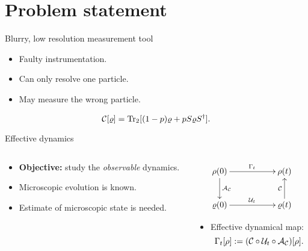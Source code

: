 \section{Problem statement}

\begin{frame}{Blurry, low resolution measurement tool}
    \begin{itemize}
        \item Faulty instrumentation.
        \item Can only resolve one particle.
        \item May measure the wrong particle.
    \end{itemize}
    \begin{equation*}
        \mathcal{C}[\varrho]=\Tr_{2}[(1-p)\varrho+pS\varrho S^{\dag}].
    \end{equation*}
\end{frame}

\begin{frame}{Effective dynamics}
    \begin{columns}
        \begin{column}{0.5\textwidth}
            \begin{itemize}
                \item \textbf{Objective:} study the \textit{observable} dynamics.
                \item Microscopic evolution is known.
                \item Estimate of microscopic state is needed. 
            \end{itemize}
        \end{column}
        \begin{column}{0.5\textwidth}
            \begin{displaymath}
                \xymatrix{
                  {\rho(0)} \ar[rr]^{\Gamma_{t}} \ar[d]^{\mcA_{\mcC}}
                  && {\rho(t)}\\
                  {\varrho(0)} \ar[rr]^{\mcU_{t}}
                  && {\varrho(t)} \ar[u]^{\mcC}
                }
              \end{displaymath}
              \begin{itemize}
              \item Effective dynamical map:
                \begin{equation*}
                    \Gamma_t[\rho]:=(\mathcal{C} \circ \mathcal{U}_t \circ \mathcal{A}_{\mathcal{C}})[\rho].
                \end{equation*}
            \end{itemize}
        \end{column}
    \end{columns}
\end{frame}